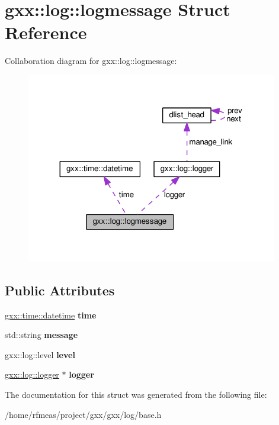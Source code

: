 \hypertarget{structgxx_1_1log_1_1logmessage}{}\section{gxx\+:\+:log\+:\+:logmessage Struct Reference}
\label{structgxx_1_1log_1_1logmessage}


Collaboration diagram for gxx\+:\+:log\+:\+:logmessage\+:
\nopagebreak
\begin{figure}[H]
\begin{center}
\leavevmode
\includegraphics[width=311pt]{structgxx_1_1log_1_1logmessage__coll__graph}
\end{center}
\end{figure}
\subsection*{Public Attributes}
\begin{DoxyCompactItemize}
\item 
\hyperlink{structgxx_1_1time_1_1datetime}{gxx\+::time\+::datetime} {\bfseries time}\hypertarget{structgxx_1_1log_1_1logmessage_a3f1a34a0a0d1d8a38c0bf918e4733447}{}\label{structgxx_1_1log_1_1logmessage_a3f1a34a0a0d1d8a38c0bf918e4733447}

\item 
std\+::string {\bfseries message}\hypertarget{structgxx_1_1log_1_1logmessage_a51747e71de4c7f675f04487c9e9b9354}{}\label{structgxx_1_1log_1_1logmessage_a51747e71de4c7f675f04487c9e9b9354}

\item 
gxx\+::log\+::level {\bfseries level}\hypertarget{structgxx_1_1log_1_1logmessage_a061c00da001e91c343a01178f7932af1}{}\label{structgxx_1_1log_1_1logmessage_a061c00da001e91c343a01178f7932af1}

\item 
\hyperlink{classgxx_1_1log_1_1logger}{gxx\+::log\+::logger} $\ast$ {\bfseries logger}\hypertarget{structgxx_1_1log_1_1logmessage_a9f96533b5144250c26fc4a1da42ce5ba}{}\label{structgxx_1_1log_1_1logmessage_a9f96533b5144250c26fc4a1da42ce5ba}

\end{DoxyCompactItemize}


The documentation for this struct was generated from the following file\+:\begin{DoxyCompactItemize}
\item 
/home/rfmeas/project/gxx/gxx/log/base.\+h\end{DoxyCompactItemize}
